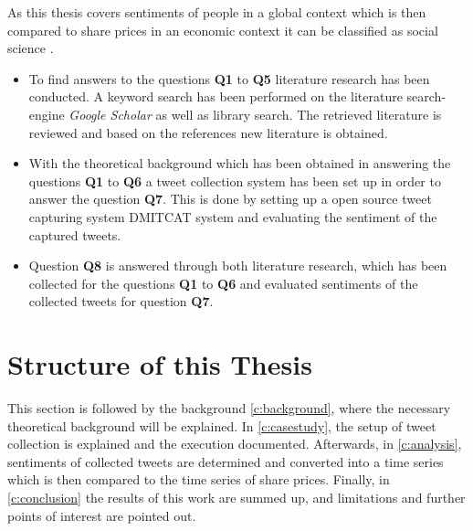 As this thesis covers sentiments of people in a global context which is then compared to share prices in an economic context it can be classified as social science \citep{Recker2013}.

\begin{itemize}
	\item To find answers to the questions \textbf{Q1} to \textbf{Q5} literature research has been conducted.
	A keyword search has been performed on the literature search-engine \emph{Google Scholar} as well as library search.
	The retrieved literature is reviewed and based on the references new literature is obtained.
	
	\item With the theoretical background which has been obtained in answering the questions \textbf{Q1} to \textbf{Q6} a tweet collection system has been set up in order to answer the question \textbf{Q7}.
	This is done by setting up a open source tweet capturing system \ac{DMITCAT} system and evaluating the sentiment of the captured tweets.
	
	\item Question \textbf{Q8} is answered through both literature research, which has been collected for the questions \textbf{Q1} to \textbf{Q6} and evaluated sentiments of the collected tweets for question \textbf{Q7}.
\end{itemize}

\section{Structure of this Thesis}
\label{s:introduction-structureofthisthesis}

This section is followed by the background \cref{c:background}, where the necessary theoretical background will be explained. 
In \cref{c:casestudy}, the setup of tweet collection is explained and the execution documented.
Afterwards, in \cref{c:analysis}, sentiments of collected tweets are determined and converted into a time series which is then compared to the time series of share prices.
Finally, in \cref{c:conclusion} the results of this work are summed up, and limitations and further points of interest are pointed out.